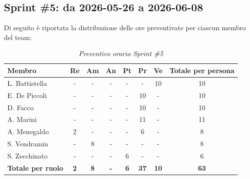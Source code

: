 ﻿\documentclass[a4paper, 10pt, colorlinks=true, linkcolor=black, urlcolor=blue, citecolor=blue, hidelinks]{article}
\renewcommand{\arraystretch}{1.2}
\begin{document}
\subsection{Sprint \#5: da 2026-05-26 a 2026-06-08}
Di seguito è riportata la distribuzione delle ore preventivate per ciascun membro del team:

\begin{table}[H]
    \centering
    \renewcommand{\arraystretch}{1.4}
    \begin{tabular}{|l|c|c|c|c|c|c|c|}
        \hline
        \rowcolor{bluBitless!15}
        \textbf{Membro} & \textbf{Re} & \textbf{Am} & \textbf{An} & \textbf{Pt} & \textbf{Pr} & \textbf{Ve} & \textbf{Totale per persona} \\
        \hline
        L. Battistella & - & - & - & - & - & 10 & 10 \\ \hline
        E. De Piccoli & - & - & - & - & 10 & - & 10 \\ \hline
        D. Facco & - & - & - & - & 10 & - & 10 \\ \hline
        A. Marini & - & - & - & - & 11 & - & 11 \\ \hline
        A. Menegaldo & 2 & - & - & - & 6 & - & 8 \\ \hline
        S. Vendramin & - & 8 & - & - & - & - & 8 \\ \hline
        S. Zecchinato & - & - & - & 6 & - & - & 6 \\ \hline
        \rowcolor{bluBitless!8}
        \textbf{Totale per ruolo} & \textbf{2} & \textbf{8} & \textbf{-} & \textbf{6} & \textbf{37} & \textbf{10} & \textbf{63} \\
        \hline
    \end{tabular}
    \caption{\textit{Preventivo orario Sprint \#5}}
\end{table}
\end{document}

